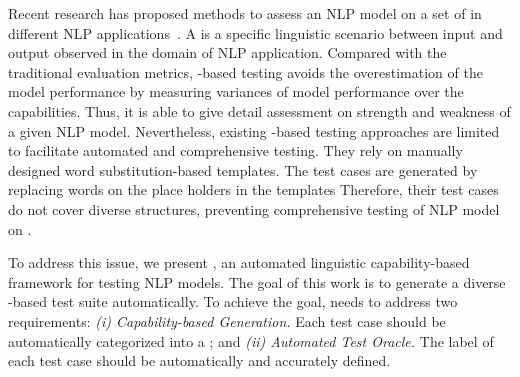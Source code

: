 Recent research has proposed methods to assess an NLP model on a set of \lcs in 
different NLP applications~\cite{marcoACL2020checklist,rottger2020hatecheck}. 
A \lc is a specific linguistic scenario between input and output observed in the  domain 
of NLP application. Compared with the traditional evaluation metrics, 
\lc-based testing avoids the overestimation of the model performance by
measuring variances of model performance over the capabilities. Thus,
it is able to give detail assessment on strength and weakness of a given NLP model.
Nevertheless, existing \lc-based testing approaches are limited to facilitate automated and comprehensive testing.
They rely on manually designed word substitution-based templates. The test cases are generated by  replacing words on the place holders in the templates \cite{marcoACL2020checklist, rottger2020hatecheck} 
Therefore, their test cases  do not cover diverse \sent structures, preventing comprehensive testing of NLP model on \lcs.

To address this issue, we present \tool,
an automated linguistic capability-based framework for testing NLP models. 
The goal of this work is to generate a diverse \lc-based test suite automatically.
To achieve the goal, \tool needs to address two requirements:
\textit{(i) Capability-based Generation.} Each test case should be automatically categorized into a \lc;
and \textit{(ii) Automated Test Oracle.} The label of each test case should be automatically
  and accurately defined.

